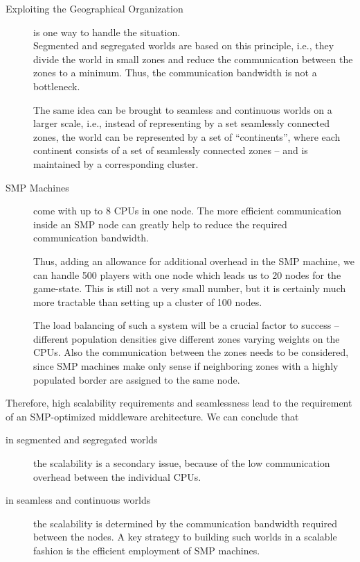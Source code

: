 \documentclass[a4paper, 10pt]{book}
\begin{document}
            \begin{description}
                \item[Exploiting the Geographical Organization] is one way to handle
                    the situation.\\
                    Segmented and segregated worlds are based on this
                    principle, i.e., they divide the world in small zones and reduce the
                    communication between the zones to a minimum. Thus, the
                    communication bandwidth is not a bottleneck.

                    The same idea can be brought to seamless and continuous worlds on a
                    larger scale, i.e., instead of representing by a set 
                    seamlessly connected zones, the world can be represented by a set of
                    ``continents'', where each continent consists of a set of seamlessly
                    connected zones -- and is maintained by a corresponding cluster. 
                \item[SMP Machines] come with up to 8 CPUs in one node. The more
                    efficient communication inside an SMP node can greatly help to
                    reduce the required communication bandwidth.  

                    Thus, adding an allowance for additional overhead in the SMP
                    machine, we can handle 500 players with one node which leads us to
                    20 nodes for the game-state. This is still not a very small number,
                    but it is certainly much more tractable than setting up a cluster
                    of 100 nodes.

                    The load balancing of such a system will be a crucial factor to
                    success -- different population densities give different zones
                    varying weights on the CPUs. Also the communication between the
                    zones needs to be considered, since SMP machines make only sense if
                    neighboring zones with a highly populated border are assigned to the
                    same node.
            \end{description}
            Therefore, high scalability requirements and seamlessness lead to the
            requirement of an SMP-optimized middleware architecture. We can
            conclude that
            \begin{description}
                \item[in segmented and segregated worlds] the scalability is a
                    secondary issue, because of the low communication overhead between
                    the individual CPUs.
                \item[in seamless and continuous worlds] the scalability is determined
                    by the communication bandwidth required between the
                    nodes. A key strategy to building such worlds in a scalable fashion is
                    the efficient employment of SMP machines.
            \end{description}
\end{document}
